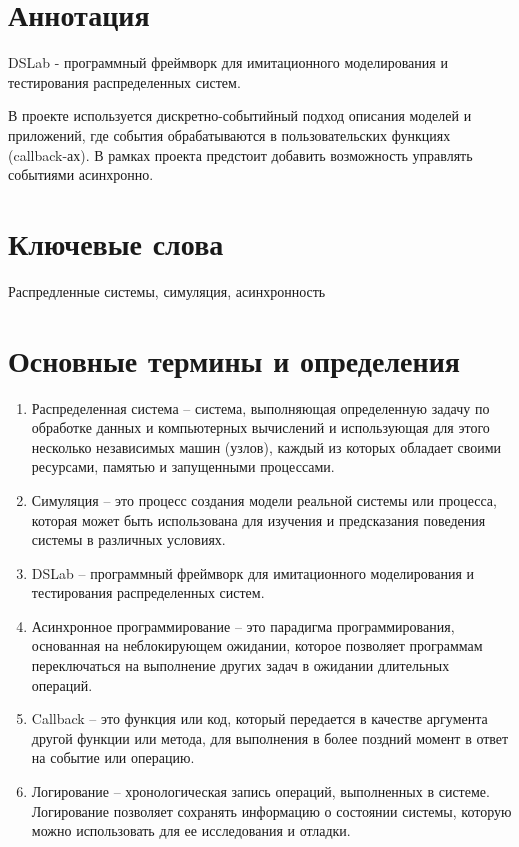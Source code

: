 
\section*{Аннотация}

DSLab - программный фреймворк для имитационного моделирования и тестирования распределенных систем.

В проекте используется дискретно-событийный подход описания моделей и приложений, где события обрабатываются в пользовательских функциях (callback-ах). В рамках проекта предстоит добавить возможность управлять событиями асинхронно.

\section*{Ключевые слова}

Распредленные системы, симуляция, асинхронность 


\newpage 

\section{Основные термины и определения}

\begin{enumerate}
    \item Распределенная система -- система, выполняющая определенную задачу по обработке данных и компьютерных вычислений и использующая для этого несколько независимых машин (узлов), каждый из которых обладает своими ресурсами, памятью и запущенными процессами.
    \item Симуляция -- это процесс создания модели реальной системы или процесса, которая может быть использована для изучения и предсказания поведения системы в различных условиях.
    \item DSLab -- программный фреймворк для имитационного моделирования и тестирования распределенных систем.
    \item Асинхронное программирование -- это парадигма программирования, основанная на неблокирующем ожидании, которое позволяет программам переключаться на выполнение других задач в ожидании длительных операций.
    \item Callback -- это функция или код, который передается в качестве аргумента другой функции или метода, для выполнения в более поздний момент в ответ на событие или операцию.
    \item Логирование -- хронологическая запись операций, выполненных в системе. Логирование позволяет сохранять информацию о состоянии системы, которую можно использовать для ее исследования и отладки.
\end{enumerate}


